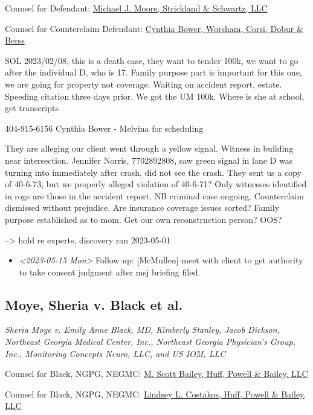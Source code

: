 \documentclass[11pt]{article}
\begin{document}
Counsel for Defendant: \href{https://gabar.reliaguide.com/lawyer/30319-GA-Michael-Moore-273655}{Michael J. Moore, Strickland \& Schwartz, LLC}

Counsel for Counterclaim Defendant: \href{https://gabar.reliaguide.com/lawyer/30006-GA-Cynthia-Bower-270882}{Cynthia Bower, Worsham, Corsi, Dobur \& Berss}

SOL 2023/02/08, this is a death case, they want to tender 100k, we want to go after the individual D, who is 17. Family purpose part is important for this one, we are going for property not coverage. Waiting on accident report, estate. Speeding citation three days prior. We got the UM 100k. Where is she at school, get transcripts

404-915-6156 Cynthia Bower - Melvina for scheduling

They are alleging our client went through a yellow signal. Witness in building near intersection. Jennifer Norris, 7702892808, saw green signal in lane D was turning into immediately after crash, did not see the crash. They sent us a copy of 40-6-73, but we properly alleged violation of 40-6-71? Only witnesses identified in rogs are those in the accident report. NB criminal case ongoing. Counterclaim dismissed without prejudice. Are insurance coverage issues sorted? Family purpose established as to mom. Get our own reconstruction person? OOS?

--> hold re experts, discovery ran 2023-05-01

\begin{itemize}
\item \textit{<2023-05-15 Mon> } Follow up: [McMullen] meet with client to get authority to take consent judgment after msj briefing filed.
\end{itemize}

\subsection*{Moye, Sheria v. Black et al.}
\label{sec:org04c4a14}

\emph{Sheria Moye v. Emily Anne Black, MD, Kimberly Stanley, Jacob Dickson, Northeast Georgia Medical Center, Inc., Northeast Georgia Physician's Group, Inc., Monitoring Concepts Neuro, LLC, and US IOM, LLC}

Counsel for Black, NGPG, NEGMC: \href{https://gabar.reliaguide.com/lawyer/30309-GA-Michael-Bailey-248155}{M. Scott Bailey, Huff, Powell \& Bailey, LLC}

Counsel for Black, NGPG, NEGMC: \href{https://gabar.reliaguide.com/lawyer/30309-GA-Lindsey-Costakos-279062}{Lindsey L. Costakos, Huff, Powell \& Bailey, LLC}
\end{document}
